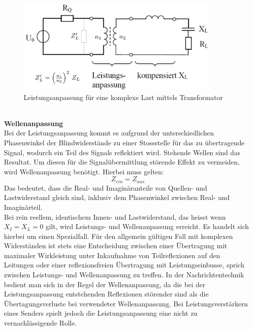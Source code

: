 \begin{figure}[!ht]
	\centering
	\includegraphics[width=10cm]{content/bilder/AnpassungKomplexerLast.pdf}%
	\caption{Leistungsanpassung für eine komplexe Last mittels Transformator \cite{Tekom}}
	\label{fig:AnpassungKomplexerLast}
\end{figure}\\
\textbf{Wellenanpassung} \\
Bei der Leistungsanpassung kommt es aufgrund der unterschiedlichen Phasenwinkel der Blindwiderstände zu einer Stossstelle für das zu übertragende Signal, wodurch ein Teil des Signals reflektiert wird. Stehende Wellen sind das Resultat. Um diesen für die Signalübermittlung störende Effekt zu vermeiden, wird Wellenanpassung benötigt. Hierbei muss gelten:
\[Z_{ein} = Z_{aus}\]
Das bedeutet, dass die Real- und Imaginäranteile von Quellen- und Lastwiderstand gleich sind, inklusiv dem Phasenwinkel zwischen Real- und Imaginärteil.\\

Bei rein reellem, identischem Innen- und Lastwiderstand, das heisst wenn $X_I = X_L = 0$ gilt, wird Leistungs- und Wellenanpassung erreicht. Es handelt sich hierbei um einen Spezialfall. Für den allgemein gültigen Fall mit komplexen Widerständen ist stets eine Entscheidung zwischen einer Übertragung mit maximaler Wirkleistung unter Inkaufnahme von Teilreflexionen auf den Leitungen oder einer reflexionsfreien Übertragung mit Leistungseinbusse, sprich zwischen Leistungs- und Wellenanpassung zu treffen. In der Nachrichtentechnik bedient man sich in der Regel der Wellenanpassung, da die bei der Leistungsanpassung entstehenden Reflexionen störender sind als die Übertagungsverluste bei verwendeter Wellenanpassung. Bei Leistungsverstärkern eines Senders spielt jedoch die Leistungsanpassung eine nicht zu vernachlässigende Rolle. \\


